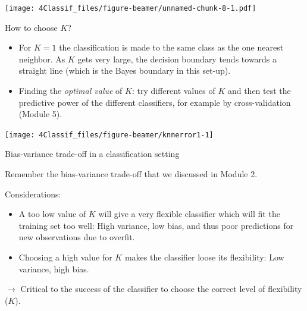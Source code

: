 \documentclass[10pt,ignorenonframetext,]{beamer}
\begin{document}
\begin{frame}

\texttt{[image: 4Classif\_files/figure-beamer/unnamed-chunk-8-1.pdf]}

\end{frame}

\begin{frame}

\begin{block}{How to choose \(K\)?}

\vspace{2mm}

\begin{itemize}
\item
  For \(K=1\) the classification is made to the same class as the one
  nearest neighbor. As \(K\) gets very large, the decision boundary
  tends towards a straight line (which is the Bayes boundary in this
  set-up).
\item
  Finding the \emph{optimal value} of \(K\): try different values of
  \(K\) and then test the predictive power of the different classifiers,
  for example by cross-validation (Module 5).
\end{itemize}

\begin{center}\texttt{[image: 4Classif\_files/figure-beamer/knnerror1-1]} \end{center}

\end{block}

\end{frame}

\begin{frame}

\begin{block}{Bias-variance trade-off in a classification setting}

\vspace{2mm} Remember the bias-variance trade-off that we discussed in
Module 2. \vspace{2mm}

Considerations: \vspace{2mm}

\begin{itemize}
\item
  A too low value of \(K\) will give a very flexible classifier which
  will fit the training set too well: High variance, low bias, and thus
  poor predictions for new observations due to overfit.
\item
  Choosing a high value for \(K\) makes the classifier loose its
  flexibility: Low variance, high bias.
\end{itemize}

\vspace{2mm}

\(\rightarrow\) Critical to the success of the classifier to choose the
correct level of flexibility (\(K\)).

\end{block}

\end{frame}
\end{document}
